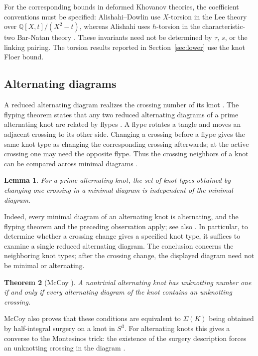 \documentclass[12pt, oneside]{amsart}
\newtheorem{theorem}{Theorem}[section]
\newtheorem{lemma}[theorem]{Lemma}
\newcommand{\bbq}{{\mathbb Q}}
\newcommand{\dbc}{\Sigma}
\begin{document}
For the corresponding bounds in deformed Khovanov theories, the coefficient conventions
must be specified: Alishahi--Dowlin use $X$-torsion in the Lee theory over
$\bbq[X,t]/(X^2-t)$, whereas Alishahi uses $h$-torsion in the characteristic-two
Bar-Natan theory \cite[Thm.~1.2]{AD}\cite[Thm.~1.2]{AlishahiBN}. These invariants need not
be determined by $\tau$, $s$, or the linking pairing. The torsion results reported in
Section~\ref{sec:lower} use the knot Floer bound.

\subsection{Alternating diagrams}\label{sec:alternating-background}

A reduced alternating diagram realizes the crossing number of its knot
\cite{Kauffman,MurasugiJones,ThisSpan}. The flyping theorem states that any two reduced
alternating diagrams of a prime alternating knot are related by flypes \cite{MT}.
A flype rotates a tangle and moves an adjacent crossing to its other side. Changing a
crossing before a flype gives the same knot type as changing the corresponding crossing
afterwards; at the active crossing one may need the opposite flype. Thus the crossing
neighbors of a knot can be compared across minimal diagrams
\cite[Lem.~2.4]{BH1705}.

\begin{lemma}\label{lem:flype}
For a prime alternating knot, the set of knot types obtained by changing one crossing in
a minimal diagram is independent of the minimal diagram.
\end{lemma}

Indeed, every minimal diagram of an alternating knot is alternating, and the flyping
theorem and the preceding observation apply; see also \cite[\S1]{McCoy}. In particular,
to determine whether a crossing change gives a specified knot type, it suffices to
examine a single reduced alternating diagram. The conclusion concerns the neighboring
knot types; after the crossing change, the displayed diagram need not be minimal or
alternating.

\begin{theorem}[McCoy {\cite[Thm.~1]{McCoy}}]\label{thm:mccoy}
A nontrivial alternating knot has unknotting number one if and only if every alternating
diagram of the knot contains an unknotting crossing.
\end{theorem}

McCoy also proves that these conditions are equivalent to $\dbc(K)$ being obtained by
half-integral surgery on a knot in $S^3$. For alternating knots this gives a converse to
the Montesinos trick: the existence of the surgery description forces an unknotting
crossing in the diagram \cite[Thm.~1 and \S7.4]{McCoy}.
\end{document}
